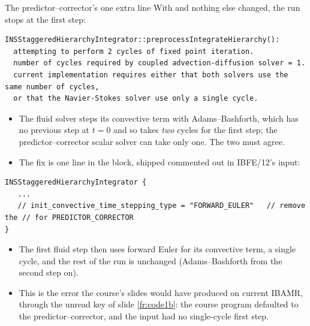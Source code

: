 \documentclass[aspectratio=169,11pt]{beamer}
\begin{document}
\begin{frame}[fragile]{The predictor--corrector's one extra line}
\label{fr:cycles}
\scriptsize
With  and nothing else changed, the run stops at the first step:
\begin{lstlisting}[style=tiny]
INSStaggeredHierarchyIntegrator::preprocessIntegrateHierarchy():
  attempting to perform 2 cycles of fixed point iteration.
  number of cycles required by coupled advection-diffusion solver = 1.
  current implementation requires either that both solvers use the same number of cycles,
  or that the Navier-Stokes solver use only a single cycle.
\end{lstlisting}
\begin{itemize}
  \item The fluid solver steps its convective term with Adams--Bashforth, which has no previous step at $t = 0$ and so takes \emph{two} cycles for the first step; the predictor--corrector scalar solver can take only one. The two must agree.
  \item The fix is one line in the  block, shipped commented out in IBFE/12's input:
\end{itemize}
\begin{lstlisting}[style=inputtiny]
INSStaggeredHierarchyIntegrator {
   ...
   // init_convective_time_stepping_type = "FORWARD_EULER"   // remove the // for PREDICTOR_CORRECTOR
}
\end{lstlisting}
\begin{itemize}
  \item The first fluid step then uses forward Euler for its convective term, a single cycle, and the rest of the run is unchanged (Adams--Bashforth from the second step on).
  \item This is the error the course's slides would have produced on current IBAMR, through the unread key of slide \ref{fr:code1b}: the course program defaulted to the predictor--corrector, and the input had no single-cycle first step.
\end{itemize}
\end{frame}
\end{document}
